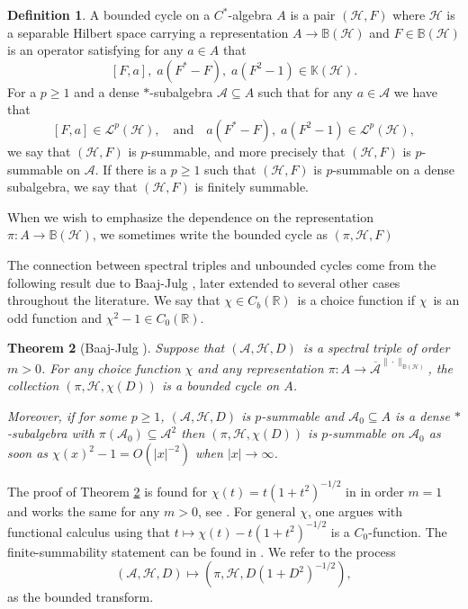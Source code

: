 \documentclass[a4paper,reqno]{amsart}
\numberwithin{equation}{section}
\def\R{\mathbb{R}}
\newtheorem{thm}{Theorem}[section]
\theoremstyle{definition}
\newtheorem{definition}[thm]{Definition}
\theoremstyle{remark}
\begin{document}
\begin{definition}
\label{bddcycle}
A bounded cycle on a $C^*$-algebra $A$ is a pair $(\mathcal{H},F)$ where $\mathcal{H}$ is a separable Hilbert space carrying a representation $A\to \mathbb{B}(\mathcal{H})$ and $F\in \mathbb{B}(\mathcal{H})$ is an operator satisfying for any $a\in A$ that
$$[F,a], \; a(F^*-F), \;a(F^2-1)\in \mathbb{K}(\mathcal{H}).$$
For a $p\geq 1$ and a dense $*$-subalgebra $\mathcal{A}\subseteq A$ such that for any $a\in \mathcal{A}$ we have that
$$[F,a]\in \mathcal{L}^p(\mathcal{H}),\quad \mbox{and} \quad a(F^*-F), \;a(F^2-1)\in \mathcal{L}^p(\mathcal{H}),$$
we say that $(\mathcal{H},F)$ is $p$-summable, and more precisely that $(\mathcal{H},F)$ is $p$-summable on $\mathcal{A}$. If there is a $p\geq 1$ such that $(\mathcal{H},F)$ is $p$-summable on a dense subalgebra, we say that $(\mathcal{H},F)$ is finitely summable. 


When we wish to emphasize the dependence on the representation $\pi:A\to \mathbb{B}(\mathcal{H})$, we sometimes write the bounded cycle as $(\pi,\mathcal{H},F)$
\end{definition}


The connection between spectral triples and unbounded cycles come from the following result due to Baaj-Julg \cite{baajjulg}, later extended to several other cases throughout the literature. We say that $\chi\in C_b(\R)$ is a choice function if $\chi$ is an odd function and $\chi^2-1\in C_0(\R)$. 


\begin{thm}[Baaj-Julg \cite{baajjulg}]
\label{baajjulgthm}
Suppose that $(\mathcal{A},\mathcal{H},D)$ is a spectral triple of order $m>0$. For any choice function $\chi$ and any representation $\pi:A\to \overline{\mathcal{A}}^{\|\cdot\|_{\mathbb{B}(\mathcal{H})}}$, the collection $(\pi,\mathcal{H},\chi(D))$ is a bounded cycle on $A$.


Moreover, if for some $p\geq1$, $(\mathcal{A},\mathcal{H},D)$ is $p$-summable and $\mathcal{A}_0\subseteq A$ is a dense $*$-subalgebra with $\pi(\mathcal{A}_0)\subseteq \mathcal{A}^2$ then $(\pi,\mathcal{H},\chi(D))$ is $p$-summable on $\mathcal{A}_0$ as soon as $\chi(x)^2-1=O(|x|^{-2})$ when $|x|\to \infty$.
\end{thm}


The proof of Theorem \ref{baajjulgthm} is found for $\chi(t)=t(1+t^2)^{-1/2}$ in \cite{baajjulg} in order $m=1$ and works the same for any $m>0$, see \cite[Theorem A.6]{GM15}. For general $\chi$, one argues with functional calculus using that $t\mapsto \chi(t)-t(1+t^2)^{-1/2}$ is a $C_0$-function. The finite-summability statement can be found in \cite[Proposition 3.14]{CGRS11}. We refer to the process 
$$(\mathcal{A},\mathcal{H},D)\mapsto (\pi,\mathcal{H},D(1+D^2)^{-1/2}),$$
as the bounded transform.
\end{document}
